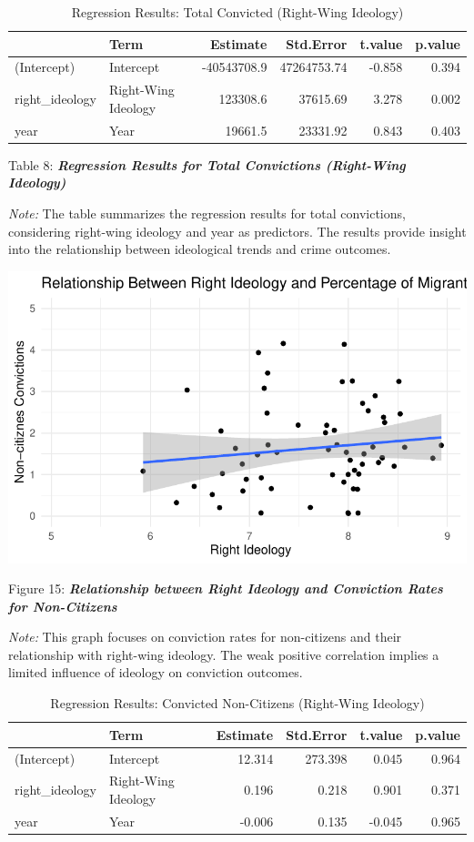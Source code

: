 \documentclass[
]{article}
\begin{document}
\begin{table}
\centering
\caption{Regression Results: Total Convicted (Right-Wing Ideology)}
\centering
\begin{tabular}[t]{l|l|r|r|r|r}
\hline
  & Term & Estimate & Std.Error & t.value & p.value\\
\hline
(Intercept) & Intercept & -40543708.9 & 47264753.74 & -0.858 & 0.394\\
\hline
right\_ideology & Right-Wing Ideology & 123308.6 & 37615.69 & 3.278 & 0.002\\
\hline
year & Year & 19661.5 & 23331.92 & 0.843 & 0.403\\
\hline
\end{tabular}
\end{table}

Table 8: \textbf{\emph{Regression Results for Total Convictions
(Right-Wing Ideology)}}

\emph{Note:} The table summarizes the regression results for total
convictions, considering right-wing ideology and year as predictors. The
results provide insight into the relationship between ideological trends
and crime outcomes.

\includegraphics{DataMan_Project_files/figure-pdf/unnamed-chunk-47-1.pdf}

Figure 15: \textbf{\emph{Relationship between Right Ideology and
Conviction Rates for Non-Citizens}}

\emph{Note:} This graph focuses on conviction rates for non-citizens and
their relationship with right-wing ideology. The weak positive
correlation implies a limited influence of ideology on conviction
outcomes.

\begin{table}
\centering
\caption{Regression Results: Convicted Non-Citizens (Right-Wing Ideology)}
\centering
\begin{tabular}[t]{l|l|r|r|r|r}
\hline
  & Term & Estimate & Std.Error & t.value & p.value\\
\hline
(Intercept) & Intercept & 12.314 & 273.398 & 0.045 & 0.964\\
\hline
right\_ideology & Right-Wing Ideology & 0.196 & 0.218 & 0.901 & 0.371\\
\hline
year & Year & -0.006 & 0.135 & -0.045 & 0.965\\
\hline
\end{tabular}
\end{table}
\end{document}
